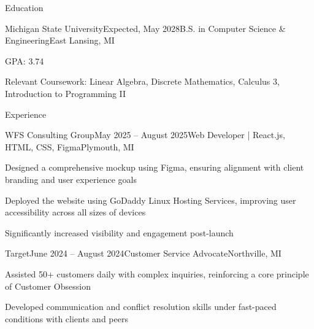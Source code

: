 \documentclass[
	11pt
]{resume}
\begin{document}
	\begin{rSection}{Education}
		\begin{rSectionEntry}{Michigan State University}{Expected, May 2028}{B.S. in Computer Science \& Engineering}{East Lansing, MI}
			\item GPA: 3.74
			\item Relevant Coursework: Linear Algebra, Discrete Mathematics, Calculus 3, Introduction to Programming II
		\end{rSectionEntry}
	\end{rSection}

	\begin{rSection}{Experience}
		\begin{rSectionEntry}{WFS Consulting Group}{May 2025 -- August 2025}{Web Developer | React.js, HTML, CSS, Figma}{Plymouth, MI}
			\item Designed a comprehensive mockup using Figma, ensuring alignment with client branding and user experience goals
			\item Deployed the website using GoDaddy Linux Hosting Services, improving user accessibility across all sizes of devices
			\item Significantly increased visibility and engagement post-launch
		\end{rSectionEntry}

		\begin{rSectionEntry}{Target}{June 2024 -- August 2024}{Customer Service Advocate}{Northville, MI}
			\item Assisted 50+ customers daily with complex inquiries, reinforcing a core principle of Customer Obsession
			\item Developed communication and conflict resolution skills under fast-paced conditions with clients and peers
		\end{rSectionEntry}
	\end{rSection}
\end{document}
